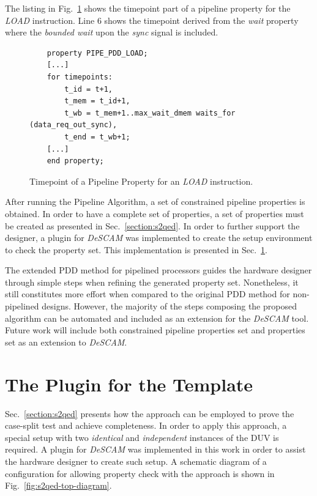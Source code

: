 The listing in Fig.~\ref{fig:load-ptt-merg-algorithm} shows the timepoint part of a pipeline property for the \textit{LOAD} instruction. Line 6 shows the timepoint derived from the \textit{wait} property where the \textit{bounded wait} upon the \textit{sync} signal is included. 

\begin{figure}[htb!]
    \begin{lstlisting}
    property PIPE_PDD_LOAD;
    [...]
    for timepoints:
        t_id = t+1,
        t_mem = t_id+1,
        t_wb = t_mem+1..max_wait_dmem waits_for (data_req_out_sync),
        t_end = t_wb+1;
    [...]
    end property;\end{lstlisting}
    \caption{Timepoint of a Pipeline Property for an \textit{LOAD} instruction.}
    \label{fig:load-ptt-merg-algorithm}
\end{figure}

After running the Pipeline Algorithm, a set of constrained pipeline properties is obtained. In order to have a complete set of properties, a set of \SSQED{} properties must be created as presented in Sec.~\ref{section:s2qed}. In order to further support the designer, a plugin for \textit{DeSCAM} was implemented to create the setup environment to check the \SSQED{} property set. This implementation is presented in Sec.~\ref{section:plugio-s2qed-top}.

The extended PDD method for pipelined processors guides the hardware designer through simple steps when refining the generated property set. Nonetheless, it still constitutes more effort when compared to the original PDD method for non-pipelined designs. However, the majority of the steps composing the proposed algorithm can be automated and included as an extension for the \textit{DeSCAM} tool. Future work will include both constrained pipeline properties set and \SSQED{} properties set as an extension to \textit{DeSCAM}.

\section{The Plugin for the \SSQED{} Template}
\label{section:plugio-s2qed-top}

Sec.~\ref{section:s2qed} presents how the \SSQED{} approach can be employed to prove the case-split test and achieve completeness. In order to apply this approach, a special setup with two \textit{identical} and \textit{independent} instances of the DUV is required. A plugin for \textit{DeSCAM} was implemented in this work in order to assist the hardware designer to create such setup. A schematic diagram of a configuration for allowing property check with the \SSQED{} approach is shown in Fig.~\ref{fig:s2qed-top-diagram}. 

